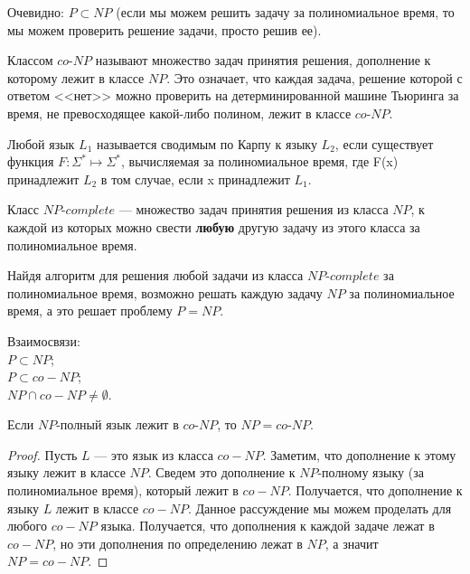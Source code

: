     \begin{Rem}
        Очевидно: $P \subset NP$ (если мы можем решить задачу за полиномиальное время, то мы можем проверить решение задачи, просто решив ее).
    \end{Rem}
    \begin{Def}
        Классом $co$-$NP$ называют множество задач принятия решения, дополнение к которому лежит в классе $NP$. Это означает, что каждая задача, решение которой с ответом <<нет>> можно проверить на детерминированной машине Тьюринга за время, не превосходящее какой-либо полином, лежит в классе $co$-$NP$.
    \end{Def}
    \begin{Def}
    Любой язык $L_1$ называется сводимым по Карпу к языку $L_2$, если существует функция $F\colon \Sigma ^{*}\mapsto \Sigma ^{*}$, вычисляемая за полиномиальное время, где F(x) принадлежит $L_2$ в том случае, если x принадлежит $L_1$. 
    \end{Def}
    \begin{Def}
     Класс $NP$-$complete$ --- множество задач принятия решения из класса $NP$, к каждой из которых можно свести \textbf{любую} другую задачу из этого класса за полиномиальное время.
    \end{Def}
    \begin{Rem}
    Найдя алгоритм для решения любой задачи из класса $NP$-$complete$ за полиномиальное время, возможно решать каждую задачу $NP$ за полиномиальное время, а это решает проблему $P=NP$.
    \end{Rem}
    \begin{Rem}
        Взаимосвязи:\\
        $P \subset NP$;\\
        $P \subset co-NP$;\\
        $NP \cap co-NP \neq \emptyset$.
    \end{Rem}
    \begin{Thm}
    Если $NP$-полный язык лежит в $co$-$NP$, то $NP = co$-$NP$.
    \end{Thm}
    \begin{proof}
    Пусть $L$ --- это язык из класса $co-NP$. Заметим, что дополнение к этому языку лежит в классе $NP$. Сведем это дополнение к $NP$-полному языку (за полиномиальное время), который лежит в $co-NP$. Получается, что дополнение к языку $L$ лежит в классе $co-NP$. Данное рассуждение мы можем проделать для любого $co-NP$ языка. Получается, что дополнения к каждой задаче лежат в $co-NP$, но эти дополнения по определению лежат в $NP$, а значит $NP = co-NP$.
    \end{proof}


